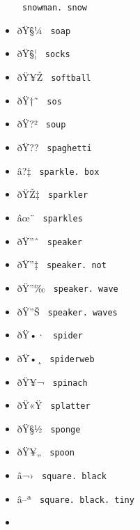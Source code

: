 \begin{itemize}
{  \texttt{\ snowman.\ snow\ }}
\item
  \label{symbol-soap}{{ ðŸ§¼ } \texttt{\ soap\ }}
\item
  \label{symbol-socks}{{ ðŸ§¦ } \texttt{\ socks\ }}
\item
  \label{symbol-softball}{{ ðŸ¥Ž } \texttt{\ softball\ }}
\item
  \label{symbol-sos}{{ ðŸ†˜ } \texttt{\ sos\ }}
\item
  \label{symbol-soup}{{ ðŸ?² } \texttt{\ soup\ }}
\item
  \label{symbol-spaghetti}{{ ðŸ?? }
  \texttt{\ spaghetti\ }}
\item
  \label{symbol-sparkle.box}{{ â?‡ }
  \texttt{\ sparkle.\ box\ }}
\item
  \label{symbol-sparkler}{{ ðŸŽ‡ } \texttt{\ sparkler\ }}
\item
  \label{symbol-sparkles}{{ âœ¨ } \texttt{\ sparkles\ }}
\item
  \label{symbol-speaker}{{ ðŸ''ˆ } \texttt{\ speaker\ }}
\item
  \label{symbol-speaker.not}{{ ðŸ''‡ }
  \texttt{\ speaker.\ not\ }}
\item
  \label{symbol-speaker.wave}{{ ðŸ''‰ }
  \texttt{\ speaker.\ wave\ }}
\item
  \label{symbol-speaker.waves}{{ ðŸ''Š }
  \texttt{\ speaker.\ waves\ }}
\item
  \label{symbol-spider}{{ ðŸ•· } \texttt{\ spider\ }}
\item
  \label{symbol-spiderweb}{{ ðŸ•¸ }
  \texttt{\ spiderweb\ }}
\item
  \label{symbol-spinach}{{ ðŸ¥¬ } \texttt{\ spinach\ }}
\item
  \label{symbol-splatter}{{ ðŸ«Ÿ } \texttt{\ splatter\ }}
\item
  \label{symbol-sponge}{{ ðŸ§½ } \texttt{\ sponge\ }}
\item
  \label{symbol-spoon}{{ ðŸ¥„ } \texttt{\ spoon\ }}
\item
  \label{symbol-square.black}{{ â¬› }
  \texttt{\ square.\ black\ }}
\item
  \label{symbol-square.black.tiny}{{ â--ª }
  \texttt{\ square.\ black.\ tiny\ }}
\item

\end{itemize}
